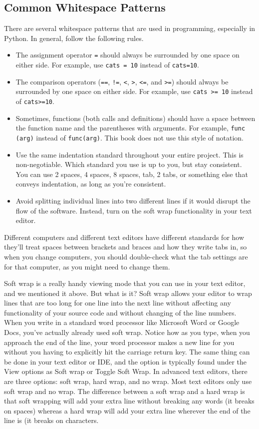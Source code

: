 \subsection{Common Whitespace Patterns}
There are several whitespace patterns that are used in programming, especially in Python. In general, follow the following rules.\par
\begin{itemize}
    \item The assignment operator \verb|=| should always be surrounded by one space on either side. For example, use \verb|cats = 10| instead of \verb|cats=10|.
    \item The comparison operators (\verb|==|, \verb|!=|, \verb|<|, \verb|>|, \verb|<=|, and \verb|>=|) should always be surrounded by one space on either side. For example, use \verb|cats >= 10| instead of \verb|cats>=10|.
    \item Sometimes, functions (both calls and definitions) should have a space between the function name and the parentheses with arguments. For example, \verb|func (arg)| instead of \verb|func(arg)|. This book does not use this style of notation.
    \item Use the same indentation standard throughout your entire project. This is non-negotiable. Which standard you use is up to you, but stay consistent. You can use 2 spaces, 4 spaces, 8 spaces, tab, 2 tabs, or something else that conveys indentation, as long as you're consistent.
    \item Avoid splitting individual lines into two different lines if it would disrupt the flow of the software. Instead, turn on the soft wrap functionality in your text editor.
\end{itemize}
Different computers and different text editors have different standards for how they'll treat spaces between brackets and braces and how they write tabs in, so when you change computers, you should double-check what the tab settings are for that computer, as you might need to change them.\par
Soft wrap is a really handy viewing mode that you can use in your text editor, and we mentioned it above. But what is it? Soft wrap allows your editor to wrap lines that are too long for one line into the next line without affecting any functionality of your source code and without changing of the line numbers. When you write in a standard word processor like Microsoft Word or Google Docs, you've actually already used soft wrap. Notice how as you type, when you approach the end of the line, your word processor makes a new line for you without you having to explicitly hit the carriage return key. The same thing can be done in your text editor or IDE, and the option is typically found under the View options as Soft wrap or Toggle Soft Wrap. In advanced text editors, there are three options: soft wrap, hard wrap, and no wrap. Most text editors only use soft wrap and no wrap. The difference between a soft wrap and a hard wrap is that soft wrapping will add your extra line without breaking any words (it breaks on spaces) whereas a hard wrap will add your extra line wherever the end of the line is (it breaks on characters.\par
